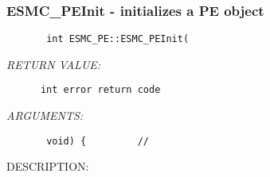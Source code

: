  
\parskip        0pt
\parindent      0pt
\baselineskip  11pt
 
\def\bv{\begin{verbatim}}
\def\ev{\end{verbatim}}
\def\be{\begin{equation}}
\def\ee{\end{equation}}
\def\bea{\begin{eqnarray}}
\def\eea{\end{eqnarray}}
\def\bi{\begin{itemize}}
\def\ei{\end{itemize}}
\def\bn{\begin{enumerate}}
\def\en{\end{enumerate}}
\def\bd{\begin{description}}
\def\ed{\end{description}}
\def\({\left (}
\def\){\right )}
\def\[{\left [}
\def\]{\right ]}
\def\<{\left  \langle}
\def\>{\right \rangle}
\def\cI{{\cal I}}
\def\diag{\mathop{\rm diag}}
\def\tr{\mathop{\rm tr}}


 
\subsubsection{ESMC\_PEInit - initializes a PE object}


  
\begin{verbatim}       int ESMC_PE::ESMC_PEInit(\end{verbatim}{\em RETURN VALUE:}
\begin{verbatim}      int error return code\end{verbatim}{\em ARGUMENTS:}
\begin{verbatim}       void) {         //\end{verbatim}
{\sf DESCRIPTION:\\ }



